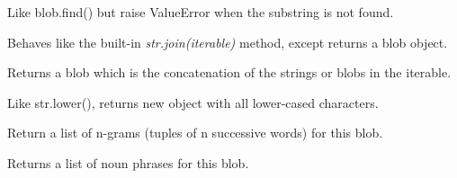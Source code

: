 \documentclass[letterpaper,10pt,english]{sphinxmanual}
\begin{document}
\begin{fulllineitems}
\begin{fulllineitems}
\end{fulllineitems}


\begin{fulllineitems}
\label{api_reference:textblob_de.blob.BaseBlob.index}
Like blob.find() but raise ValueError when the substring
is not found.

\end{fulllineitems}


\begin{fulllineitems}
\label{api_reference:textblob_de.blob.BaseBlob.join}
Behaves like the built-in \emph{str.join(iterable)} method, except
returns a blob object.

Returns a blob which is the concatenation of the strings or blobs
in the iterable.

\end{fulllineitems}


\begin{fulllineitems}
\label{api_reference:textblob_de.blob.BaseBlob.lower}
Like str.lower(), returns new object with all lower-cased characters.

\end{fulllineitems}


\begin{fulllineitems}
\label{api_reference:textblob_de.blob.BaseBlob.ngrams}
Return a list of n-grams (tuples of n successive words) for this
blob.

\end{fulllineitems}


\begin{fulllineitems}
\label{api_reference:textblob_de.blob.BaseBlob.noun_phrases}
Returns a list of noun phrases for this blob.

\end{fulllineitems}


\end{fulllineitems}
\end{document}

